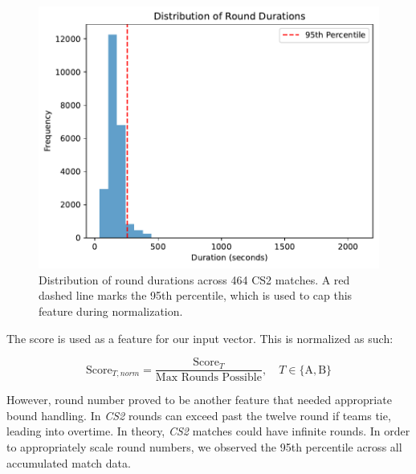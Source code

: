 \documentclass[sigconf]{acmart}
\begin{document}
\smallskip

\begin{figure}[ht]
  \centering
  \includegraphics[width=0.9\linewidth]{round_duration_dist.pdf}
  \caption{Distribution of round durations across 464 CS2 matches. A red dashed line marks the 95th percentile, which is used to cap this feature during normalization.}
  \label{fig:round_duration_dist}
\end{figure}

\smallskip

The score is used as a feature for our input vector. This is normalized as such:

\begin{equation}
  \text{Score}_{T, norm} = \frac{\text{Score}_{T}}{\text{Max Rounds Possible}}, \quad T \in \{\text{A}, \text{B}\}
\end{equation}

\medskip

However, round number proved to be another feature that needed appropriate bound handling. In \textit{CS2} rounds can exceed past the twelve round if teams tie, leading into overtime. In theory, \textit{CS2} matches could have infinite rounds. In order to appropriately scale round numbers, we observed the 95th percentile across all accumulated match data.

\smallskip
\end{document}
